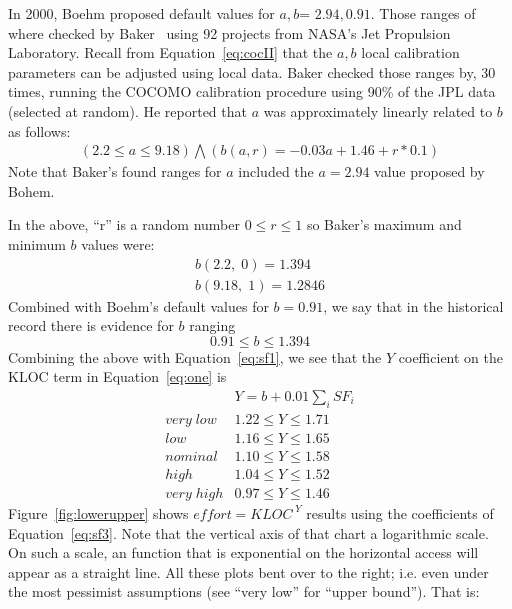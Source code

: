 \documentclass[final,twocolumn]{elsarticle}
\newcommand{\fig}[1]{Figure~\ref{fig:#1}}
\newcommand{\eq}[1]{Equation~\ref{eq:#1}}
\theoremstyle{break}
\begin{document}
In 2000, Boehm proposed default values for $a,b$= $2.94,0.91$.
Those ranges of   where checked    by Baker~\cite{baker07} 
using 92 projects from NASA's Jet Propulsion Laboratory.  Recall from \eq{cocII}
that the $a,b$ local calibration parameters can be adjusted using local data. 
Baker checked those ranges by,  30 times, running the COCOMO
calibration procedure using 90\% of the JPL data (selected
at random). He reported that
 $a$ was approximately linearly related to $b$ as follows:
\[
\begin{array}{c}
\left(2.2 \le a \le 9.18\right) \bigwedge  \left(b(a,r) = -0.03a + 1.46 + r*0.1\right)
\end{array}
\]
Note that Baker's found ranges for $a$ included the $a=2.94$ value proposed by Bohem.

In the  above,  ``r'' is a random number $0 \le r \le 1$ so Baker's maximum and minimum $b$ values
were:
\[
\begin{array}{c}
b(2.2,\; 0) = 1.394\\
b(9.18,\; 1) =1.2846
\end{array}
\]
Combined with Boehm's default values for $b=0.91$, we say that in the historical record
there is evidence for $b$ ranging
\begin{equation}\label{eq:sf2}
0.91 \le b \le 1.394
\end{equation}
Combining the above with \eq{sf1}, we see that the $Y$ coefficient on the 
KLOC term in \eq{one} is 
\begin{equation}\label{eq:sf3} 
\begin{array}{r|l}
                  &  Y= b + 0.01 \sum_i SF_i \\\hline
\mathit{very\; low} &  1.22 \le Y \le 1.71\\
\mathit{  low} &  1.16 \le Y \le 1.65 \\
\mathit{nominal}& 1.10 \le Y \le 1.58    \\
\mathit{high} &  1.04 \le Y \le 1.52  \\
\mathit{very\; high} & 0.97 \le Y \le 1.46   
\end{array}
\end{equation} 
\fig{lowerupper} shows   $\mathit{effort} = \mathit{KLOC}^{\;Y}$ results using the coefficients
of \eq{sf3}. Note that the vertical axis of that chart a logarithmic scale.
On such a scale, an function that is exponential on the horizontal access will
appear as a straight line. All these plots bent over to the right; i.e. even
under the most pessimist  assumptions (see ``very low'' for ``upper bound''). That is:
\end{document}

